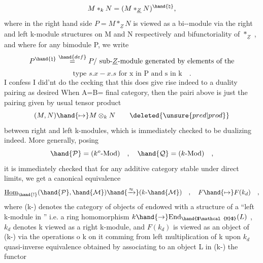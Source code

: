 \[M *_{k} N = (M *_{\underline{Z}} N)^{\hand{\natural}} ,\]
where in the right hand side $P = M *_{\underline{Z}} N$ is viewed as a bi--module
via the right and left k-module structures on M and N respectively and
bifunctoriality of $*_{\underline{Z}}$ , and where for any  bimodule P, we write
\[P^{\hand{\natural}} \overset{\hand{def}}{=} P/ \text{ sub-$\underline{Z}$-module generated by elements of the}\]
\[\text{type } s.x - x.s \text{ for x in P and s in k} \quad .\]
\deleted{(}I confess I did'nt do the cecking that this does give rise indeed to a
duality pairing as desired\deleted{)} When A=B= final category, then the 
pairi above is just the pairing given by usual tensor product
\[(M,N)\hand{\mapsto} M\otimes_{k}N \qquad \deleted{\unsure{pred|prod}}\]
between right and left k-modules, which is immediately checked to be
dualizing indeed. More generally, posing
\[\hand{\mathcal{P}}= (k^{o}\text{-Mod}) \quad , \quad \hand{\mathcal{Q}}= (k\text{-Mod}) \quad ,\]
it is immediately checked that for any additive category  stable under
 direct limits, we get a canonical equivalence
\[\underline{\text{Hom}}_{\hand{!}}(\hand{\mathcal{P}},\hand{\mathcal{M}}) \hand{\xrightarrow{\approx}} (k\text{-}\hand{\mathcal{M}}) \quad , \quad F \hand{\mapsto} F(k_{d}) \quad ,\]
where (k-) denotes the category of objects  of  endowed with a
structure  of a ``left k-module in '' i.e. a ring homomorphism
$k\hand{\to} \text{End}_{\hand{$\mathcal{M}$}}(L)$ , $k_{d}$ denotes k viewed as a right k-module, and $F(k_{d})$ is 
viewed as an object of (k-) via the operations o k on it comming from
left multiplication of k upon $k_{d}$   quasi-inverse equivalence  
obtained by associating to an object L in (k-) the functor
